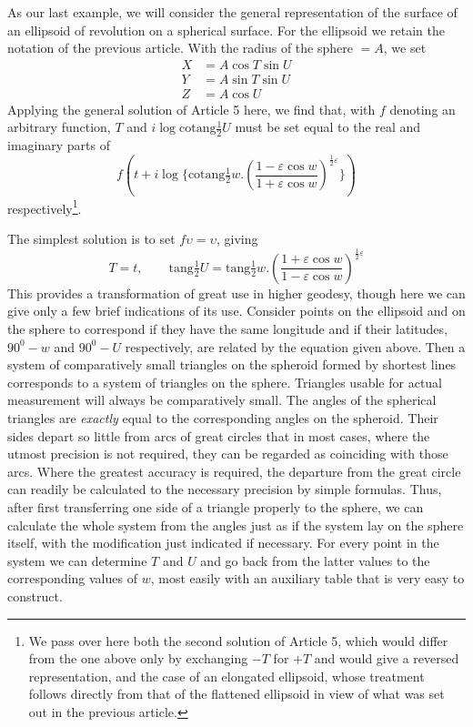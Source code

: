 As our last example, we will consider the general representation of the surface of an ellipsoid of revolution on a spherical surface. For the ellipsoid we retain the notation of the previous article. With the radius of the sphere \(=A\), we set
\[
\begin{aligned}
X&=A\cos T\sin U\\
Y&=A\sin T\sin U\\
Z&=A\cos U
\end{aligned}
\]
%
\noindent Applying the general solution of Article 5 here, we find that, with \(f\) denoting an arbitrary function, \(T\) and \(i\log\mathrm{cotang}\tfrac{1}{2}U\) must be set equal to the real and imaginary parts of
\[
f(t+i\log\{\mathrm{cotang}\tfrac{1}{2}w\mathord{.}(\frac{1-\varepsilon\cos w}{1+\varepsilon\cos w})^{\frac{1}{2}\varepsilon}\})
\]
\noindent respectively\footnote{We pass over here both the second solution of Article 5, which would differ from the one above only by exchanging \(-T\) for \(+T\) and would give a reversed representation, and the case of an elongated ellipsoid, whose treatment follows directly from that of the flattened ellipsoid in view of what was set out in the previous article.}.

The simplest solution is to set \(f\upsilon=\upsilon\), giving
\[
T=t,\qquad \mathrm{tang}\tfrac{1}{2}U=\mathrm{tang}\tfrac{1}{2}w\mathord{.}(\frac{1+\varepsilon\cos w}{1-\varepsilon\cos w})^{\frac{1}{2}\varepsilon}
\]
\noindent This provides a transformation of great use in higher geodesy, though here we can give only a few brief indications of its use. Consider points on the ellipsoid and on the sphere to correspond if they have the same longitude and if their latitudes, \(90^0-w\) and \(90^0-U\) respectively, are related by the equation given above. Then a system of comparatively small triangles on the spheroid formed by shortest lines corresponds to a system of triangles on the sphere. Triangles usable for actual measurement will always be comparatively small. The angles of the spherical triangles are \textit{exactly} equal to the corresponding angles on the spheroid. Their sides depart so little from arcs of great circles that in most cases, where the utmost precision is not required, they can be regarded as coinciding with those arcs. Where the greatest accuracy is required, the departure from the great circle can readily be calculated to the necessary precision by simple formulas. Thus, after first transferring one side of a triangle properly to the sphere, we can calculate the whole system from the angles just as if the system lay on the sphere itself, with the modification just indicated if necessary. For every point in the system we can determine \(T\) and \(U\) and go back from the latter values to the corresponding values of \(w\), most easily with an auxiliary table that is very easy to construct.
